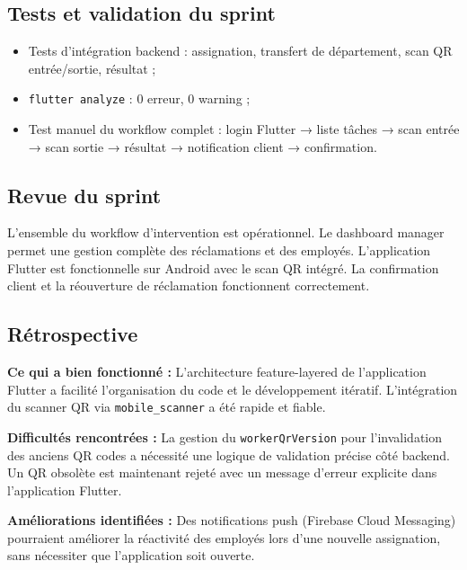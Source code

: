 \subsection{Tests et validation du sprint}

\begin{itemize}
  \item Tests d'intégration backend : assignation, transfert de département, scan QR entrée/sortie, résultat ;
  \item \texttt{flutter analyze} : 0 erreur, 0 warning ;
  \item Test manuel du workflow complet : login Flutter → liste tâches → scan entrée → scan sortie → résultat → notification client → confirmation.
\end{itemize}

\subsection{Revue du sprint}

L'ensemble du workflow d'intervention est opérationnel. Le dashboard manager permet une gestion complète des réclamations et des employés. L'application Flutter est fonctionnelle sur Android avec le scan QR intégré. La confirmation client et la réouverture de réclamation fonctionnent correctement.

\subsection{Rétrospective}

\textbf{Ce qui a bien fonctionné :} L'architecture feature-layered de l'application Flutter a facilité l'organisation du code et le développement itératif. L'intégration du scanner QR via \texttt{mobile\_scanner} a été rapide et fiable.

\textbf{Difficultés rencontrées :} La gestion du \texttt{workerQrVersion} pour l'invalidation des anciens QR codes a nécessité une logique de validation précise côté backend. Un QR obsolète est maintenant rejeté avec un message d'erreur explicite dans l'application Flutter.

\textbf{Améliorations identifiées :} Des notifications push (Firebase Cloud Messaging) pourraient améliorer la réactivité des employés lors d'une nouvelle assignation, sans nécessiter que l'application soit ouverte.

